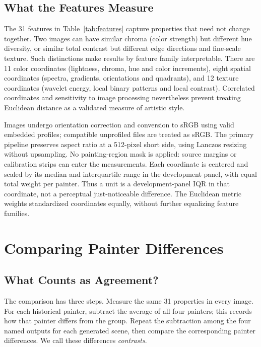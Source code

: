 \subsection{What the Features Measure}\label{sec:features}
The 31 features in Table~\ref{tab:features} capture properties that need not
change together. Two images can have similar chroma (color strength) but different
hue diversity, or similar total contrast but different edge directions and
fine-scale texture. Such distinctions make results by feature family interpretable.
There are 11 color coordinates (lightness, chroma, hue and color increments),
eight spatial coordinates (spectra, gradients, orientations and quadrants),
and 12 texture coordinates (wavelet energy, local binary patterns and local contrast).
Correlated coordinates and sensitivity to image processing nevertheless prevent
treating Euclidean distance as a validated measure of artistic style.



Images undergo orientation correction and conversion to sRGB using valid
embedded profiles; compatible unprofiled files are treated as sRGB. The primary
pipeline preserves aspect ratio at a 512-pixel short side, using Lanczos resizing
without upsampling. No painting-region mask is applied: source margins or
calibration strips can enter the measurements. Each coordinate is centered and scaled by its
median and interquartile range in the development panel, with equal total
weight per painter. Thus a unit is a development-panel IQR in that coordinate,
not a perceptual just-noticeable difference. The Euclidean metric weights
standardized coordinates equally, without further equalizing feature families.



\section{Comparing Painter Differences}\label{sec:method}
\subsection{What Counts as Agreement?}\label{sec:contrast-intuition}
The comparison has three steps. Measure the same 31 properties in every image.
For each historical painter, subtract the average of all four painters; this
records how that painter differs from the group. Repeat the subtraction among
the four named outputs for each generated scene, then compare the corresponding
painter differences. We call these differences \emph{contrasts}.


